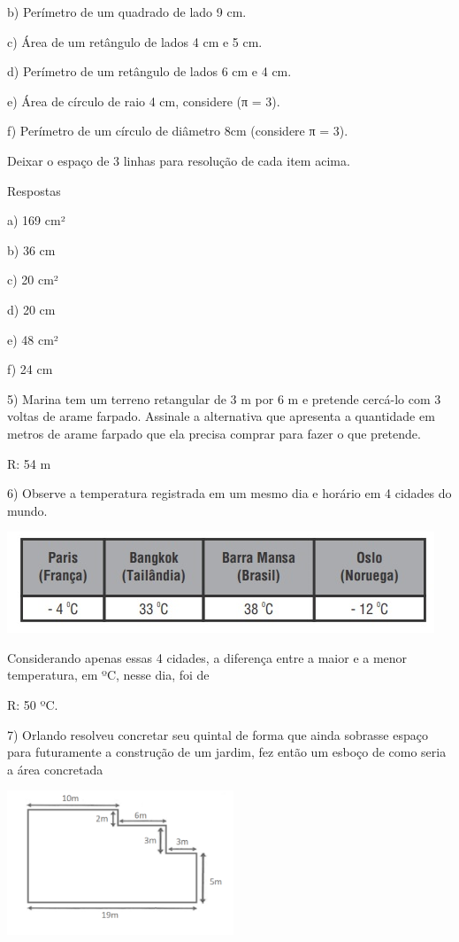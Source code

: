 b) Perímetro de um quadrado de lado 9 cm.

c) Área de um retângulo de lados 4 cm e 5 cm.

d) Perímetro de um retângulo de lados 6 cm e 4 cm.

e) Área de círculo de raio 4 cm, considere (π = 3).

f) Perímetro de um círculo de diâmetro 8cm (considere π = 3).

Deixar o espaço de 3 linhas para resolução de cada item acima.

Respostas

a) 169 cm²

b) 36 cm

c) 20 cm²

d) 20 cm

e) 48 cm²

f) 24 cm

5) Marina tem um terreno retangular de 3 m por 6 m e pretende cercá-lo
com 3 voltas de arame farpado. Assinale a alternativa que apresenta a
quantidade em metros de arame farpado que ela precisa comprar para fazer
o que pretende.

R: 54 m

6) Observe a temperatura registrada em um mesmo dia e horário em 4
cidades do mundo.

\includegraphics[width=5.03125in,height=1.1875in]{./imgSAEB_6_MAT/media/image96.png}

Considerando apenas essas 4 cidades, a diferença entre a maior e a menor
temperatura, em ºC, nesse dia, foi de

R: 50 ºC.

7) Orlando resolveu concretar seu quintal de forma que ainda sobrasse
espaço para futuramente a construção de um jardim, fez então um esboço
de como seria a área concretada

\includegraphics[width=2.66667in,height=1.6914in]{./imgSAEB_6_MAT/media/image97.png}

